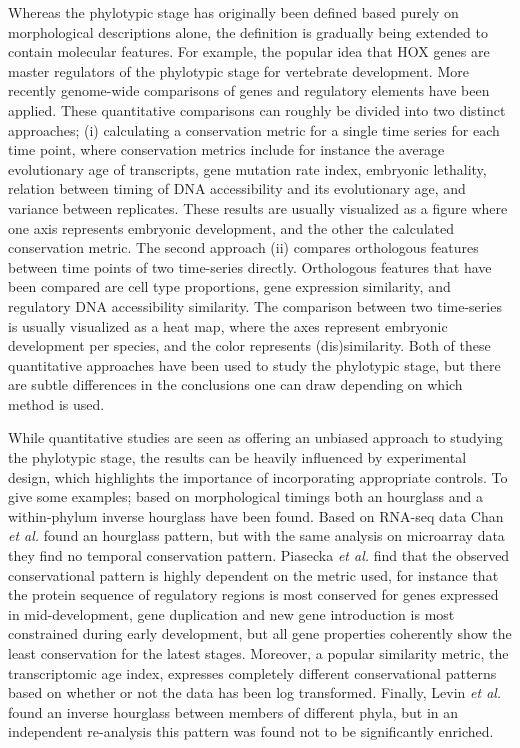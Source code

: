 Whereas the phylotypic stage has originally been defined based purely on morphological descriptions alone, the definition is gradually being extended to contain molecular features. For example, the popular idea that HOX genes are master regulators of the phylotypic stage for vertebrate development\cite{Duboule1994}. More recently genome-wide comparisons of genes and regulatory elements have been applied. These quantitative comparisons can roughly be divided into two distinct approaches; (i) calculating a conservation metric for a single time series for each time point, where conservation metrics include for instance the average evolutionary age of transcripts\cite{DomazetLoso2010}, gene mutation rate index\cite{Quint2012, Piasecka2013}, embryonic lethality\cite{Uchida2018}, relation between timing of DNA accessibility and its evolutionary age\cite{Uesaka2019}, and variance between replicates\cite{Liu2020, Uchida2022}. These results are usually visualized as a figure where one axis represents embryonic development, and the other the calculated conservation metric. The second approach (ii) compares orthologous features between time points of two time-series directly. Orthologous features that have been compared are cell type proportions\cite{Mayshar2023}, gene expression similarity\cite{Irie2011, Kalinka2010, Levin2016, marletaz2018}, and regulatory DNA accessibility similarity\cite{Hu2017, Liu2021}. The comparison between two time-series is usually visualized as a heat map, where the axes represent embryonic development per species, and the color represents (dis)similarity. Both of these quantitative approaches have been used to study the phylotypic stage, but there are subtle differences in the conclusions one can draw depending on which method is used. 

While quantitative studies are seen as offering an unbiased approach to studying the phylotypic stage, the results can be heavily influenced by experimental design, which highlights the importance of incorporating appropriate controls. To give some examples; based on morphological timings both an hourglass\cite{Cordero2020} and a within-phylum inverse hourglass\cite{OlafRP2003} have been found. Based on RNA-seq data Chan \textit{et al.} found an hourglass pattern, but with the same analysis on microarray data they find no temporal conservation pattern\cite{Chan2021}. Piasecka \textit{et al.} find that the observed conservational pattern is highly dependent on the metric used, for instance that the protein sequence of regulatory regions is most conserved for genes expressed in mid-development, gene duplication and new gene introduction is most constrained during early development, but all gene properties coherently show the least conservation for the latest stages\cite{Piasecka2013}. Moreover, a popular similarity metric, the transcriptomic age index\cite{DomazetLoso2010}, expresses completely different conservational patterns based on whether or not the data has been log transformed\cite{Piasecka2013}. Finally, Levin \textit{et al.} found an inverse hourglass between members of different phyla\cite{Levin2016}, but in an independent re-analysis this pattern was found not to be significantly enriched\cite{Dunn2018}. 

